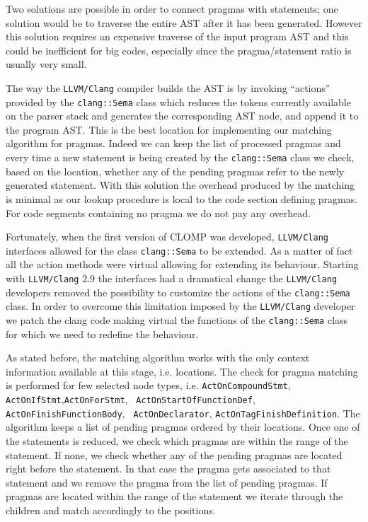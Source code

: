 \documentclass[10pt]{report}
\begin{document}
Two solutions are possible in order to connect pragmas with statements; one
solution would be to traverse the entire AST after it has been generated.
However this solution requires an expensive traverse of the input program AST
and this could be inefficient for big codes, especially since the
pragma/statement ratio is usually very small. 

The way the {\tt LLVM/Clang} compiler builds the AST is by invoking ``actions''
provided by the {\tt clang::Sema} class which reduces the tokens currently
available on the parser stack and generates the corresponding AST node, and
append it to the program AST.
This is the best location for implementing our matching algorithm for pragmas.
Indeed we can keep the list of processed pragmas and every time a new
statement is being created by the {\tt clang::Sema} class we check, based on
the location, whether any of the pending pragmas refer to the newly generated
statement. With this solution the overhead produced by the matching is minimal
as our lookup procedure is local to the code section defining pragmas. For code
segments containing no pragma we do not pay any overhead. 

Fortunately, when the first version of CLOMP was developed, {\tt LLVM/Clang}
interfaces allowed for the class {\tt clang::Sema} to be extended. As a matter
of fact all the action methods were virtual allowing for extending its
behaviour.  Starting with {\tt LLVM/Clang} 2.9 the interfaces had a dramatical
change the {\tt LLVM/Clang} developers removed the possibility to customize the
actions of the {\tt clang::Sema} class. In order to overcome this limitation
imposed by the {\tt LLVM/Clang} developer we patch the clang code making virtual
the functions of the {\tt clang::Sema} class for which we need to redefine the
behaviour. 

As stated before, the matching algorithm works with the only context information
available at this stage, i.e. locations. The check for pragma matching is
performed for few selected node types, i.e. {\tt Act\-On\-Compound\-Stmt}, {\tt
Act\-On\-If\-Stmt},{\tt Act\-On\-For\-Stmt}, {\tt
Act\-On\-Start\-Of\-FunctionDef}, {\tt Act\-On\-Finish\-Function\-Body}, {\tt
Act\-On\-Decla\-rator}, {\tt Act\-On\-Tag\-Finish\-Definition}.  The algorithm
keeps a list of pending pragmas ordered by their locations. Once one of the
statements is reduced, we check which pragmas are within the range of
the statement. If none, we check whether any of the pending pragmas are located
right before the statement. In that case the pragma gets associated to that
statement and we remove the pragma from the list of pending pragmas. If pragmas
are located within the range of the statement we iterate through the children
and match accordingly to the positions.
\end{document}
